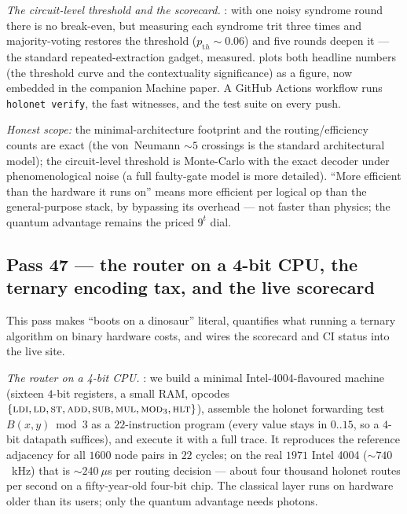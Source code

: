 \documentclass[11pt]{article}
\begin{document}
\emph{The circuit-level threshold and the scorecard.} : with one
noisy syndrome round there is no break-even, but measuring each syndrome trit three times and
majority-voting restores the threshold ($p_{\mathrm th}\sim0.06$) and five rounds deepen it --- the
standard repeated-extraction gadget, measured.  plots both headline
numbers (the threshold curve and the contextuality significance) as a figure, now embedded in the
companion Machine paper. A GitHub Actions workflow runs \texttt{holonet verify}, the fast witnesses, and
the test suite on every push.

\emph{Honest scope:} the minimal-architecture footprint and the routing/efficiency counts are exact
(the von~Neumann $\sim5$ crossings is the standard architectural model); the circuit-level threshold is
Monte-Carlo with the exact decoder under phenomenological noise (a full faulty-gate model is more
detailed). ``More efficient than the hardware it runs on'' means more efficient per logical op than the
general-purpose stack, by bypassing its overhead --- not faster than physics; the quantum advantage
remains the priced $9^t$ dial.

\subsection{Pass 47 --- the router on a 4-bit CPU, the ternary encoding tax, and the live scorecard}
\label{sec:capstone-fortyseven}

This pass makes ``boots on a dinosaur'' literal, quantifies what running a ternary algorithm on binary
hardware costs, and wires the scorecard and CI status into the live site.

\emph{The router on a 4-bit CPU.} : we build a minimal
Intel-4004-flavoured machine (sixteen $4$-bit registers, a small RAM, opcodes
$\{\textsc{ldi},\textsc{ld},\textsc{st},\textsc{add},\textsc{sub},\textsc{mul},\textsc{mod}_3,\textsc{hlt}\}$),
assemble the holonet forwarding test $B(x,y)\bmod3$ as a $22$-instruction program (every value stays in
$0..15$, so a $4$-bit datapath suffices), and execute it with a full trace. It reproduces the reference
adjacency for all $1600$ node pairs in $22$ cycles; on the real $1971$ Intel 4004 ($\sim740$~kHz) that
is $\sim240~\mu$s per routing decision --- about four thousand holonet routes per second on a
fifty-year-old four-bit chip. The classical layer runs on hardware older than its users; only the
quantum advantage needs photons.
\end{document}
